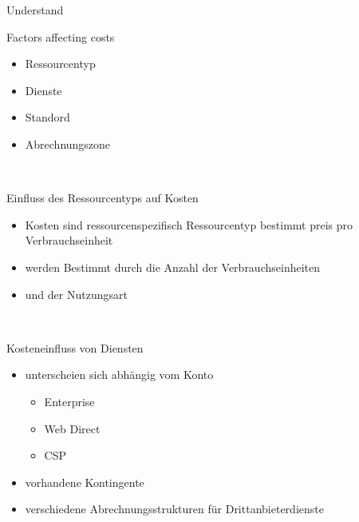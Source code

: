 \documentclass{scrartcl}
\newenvironment{flashcard}[2][]{%
    #1
    \vfill
    \centerline{\Large{#2}}
    \vfill
\newpage
}
{\newpage}
\begin{document}
    \begin{flashcard}[Understand]{Factors affecting costs}
        \begin{itemize}
            \item Ressourcentyp
            \item Dienste
            \item Standord
            \item Abrechnungszone
        \end{itemize}

    \end{flashcard}

    \begin{flashcard}[\ ]{Einfluss des Ressourcentyps auf Kosten}
        \begin{itemize}
            \item Kosten sind ressourcenspezifisch\newline
            Ressourcentyp bestimmt preis pro Verbrauchseinheit
            \item werden Bestimmt durch die Anzahl der Verbrauchseinheiten
            \item und der Nutzungsart
        \end{itemize}

    \end{flashcard}

    \begin{flashcard}[\ ]{Kosteneinfluss von Diensten}
        \begin{itemize}
            \item unterscheien sich abhängig vom Konto
            \begin{itemize}
                \item Enterprise
                \item Web Direct
                \item CSP
            \end{itemize}
            \item vorhandene Kontingente
            \item verschiedene Abrechnungsstrukturen für Drittanbieterdienste
        \end{itemize}
    \end{flashcard}
\end{document}
